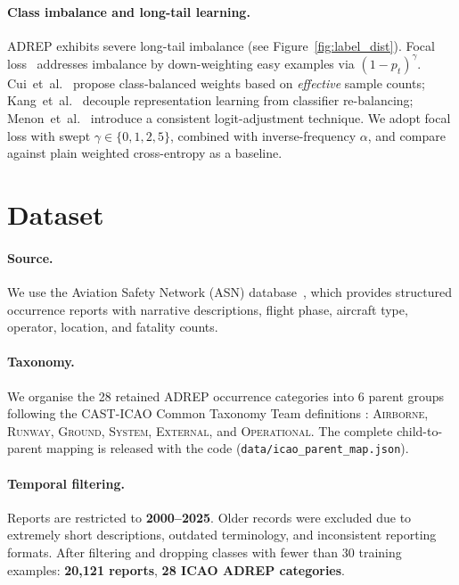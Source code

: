 \documentclass{article}
\begin{document}
\paragraph{Class imbalance and long-tail learning.}
ADREP exhibits severe long-tail imbalance (see Figure~\ref{fig:label_dist}).
Focal loss~\cite{lin2017focal} addresses imbalance by down-weighting
easy examples via $(1-p_t)^\gamma$.
Cui~et~al.~\cite{cui2019class} propose class-balanced weights based on
\emph{effective} sample counts;
Kang~et~al.~\cite{kang2020decoupling} decouple representation learning
from classifier re-balancing;
Menon~et~al.~\cite{menon2021longtail} introduce a consistent
logit-adjustment technique.
We adopt focal loss with swept $\gamma \in \{0, 1, 2, 5\}$, combined
with inverse-frequency $\alpha$, and compare against plain weighted
cross-entropy as a baseline.

\section{Dataset}

\paragraph{Source.}
We use the Aviation Safety Network (ASN) database~\cite{asn2024}, which
provides structured occurrence reports with narrative descriptions,
flight phase, aircraft type, operator, location, and fatality counts.

\paragraph{Taxonomy.}
We organise the 28 retained ADREP occurrence categories into 6 parent
groups following the CAST-ICAO Common Taxonomy Team definitions
\cite{cicct2013}: \textsc{Airborne}, \textsc{Runway},
\textsc{Ground}, \textsc{System}, \textsc{External}, and
\textsc{Operational}.
The complete child-to-parent mapping is released with the code
(\texttt{data/icao\_parent\_map.json}).

\paragraph{Temporal filtering.}
Reports are restricted to \textbf{2000--2025}.
Older records were excluded due to extremely short descriptions,
outdated terminology, and inconsistent reporting formats.
After filtering and dropping classes with fewer than 30 training
examples: \textbf{20{,}121 reports}, \textbf{28 ICAO ADREP categories}.
\end{document}
